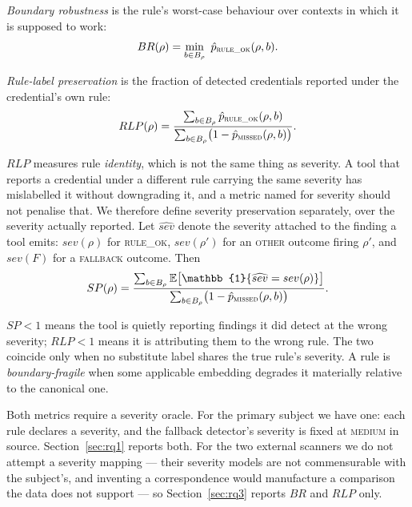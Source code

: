 \documentclass[pdflatex,sn-basic]{sn-jnl}
\begin{document}
\emph{Boundary robustness} is the rule's worst-case behaviour over contexts in which it is supposed to work:
\begin{equation}
BR(\rho) = \min_{b \in B_\rho}\ \hat p_{\textsc{rule\_ok}}(\rho,b). \label{eq:br}
\end{equation}

\emph{Rule-label preservation} is the fraction of detected credentials reported under the credential's own rule:
\begin{equation}
RLP(\rho) = \frac{\sum_{b \in B_\rho} \hat p_{\textsc{rule\_ok}}(\rho,b)}
                 {\sum_{b \in B_\rho} \bigl(1-\hat p_{\textsc{missed}}(\rho,b)\bigr)}. \label{eq:rlp}
\end{equation}

$RLP$ measures rule \emph{identity}, which is not the same thing as severity. A tool that reports a credential under a different rule carrying the same severity has mislabelled it without downgrading it, and a metric named for severity should not penalise that. We therefore define severity preservation separately, over the severity actually reported. Let $\widehat{sev}$ denote the severity attached to the finding a tool emits: $sev(\rho)$ for \textsc{rule\_ok}, $sev(\rho')$ for an \textsc{other} outcome firing $\rho'$, and $sev(F)$ for a \textsc{fallback} outcome. Then
\begin{equation}
SP(\rho) = \frac{\sum_{b \in B_\rho} \mathbb{E}\bigl[\mathbb{1}\{\widehat{sev} = sev(\rho)\}\bigr]}
                {\sum_{b \in B_\rho} \bigl(1-\hat p_{\textsc{missed}}(\rho,b)\bigr)}. \label{eq:sp}
\end{equation}

$SP < 1$ means the tool is quietly reporting findings it did detect at the wrong severity; $RLP < 1$ means it is attributing them to the wrong rule. The two coincide only when no substitute label shares the true rule's severity. A rule is \emph{boundary-fragile} when some applicable embedding degrades it materially relative to the canonical one.

Both metrics require a severity oracle. For the primary subject we have one: each rule declares a severity, and the fallback detector's severity is fixed at \textsc{medium} in source. Section~\ref{sec:rq1} reports both. For the two external scanners we do not attempt a severity mapping --- their severity models are not commensurable with the subject's, and inventing a correspondence would manufacture a comparison the data does not support --- so Section~\ref{sec:rq3} reports $BR$ and $RLP$ only.
\end{document}
